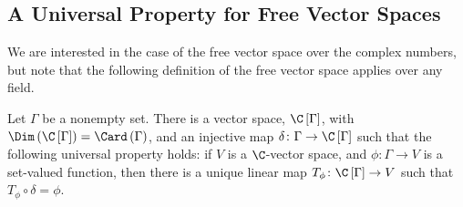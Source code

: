 \subsection{A Universal Property for Free Vector Spaces}%
We are interested in the case of the free vector space over the complex numbers, but note that the following definition of the free vector space applies over any field. 
\begin{theorem}
  Let $\Gamma$ be a nonempty set. There is a vector space, $\C\left[\Gamma\right]$, with $\Dim\left(\C\left[\Gamma\right]\right) = \Card\left(\Gamma\right)$, and an injective map $\delta\colon \Gamma\rightarrow \C\left[\Gamma\right]$ such that the following universal property holds: if $V$ is a $\C$-vector space, and $\phi\colon \Gamma\rightarrow V$ is a set-valued function, then there is a unique linear map $T_{\phi}\colon \C\left[\Gamma\right]\rightarrow V$ such that $T_{\phi}\circ \delta = \phi$.
  \begin{center}
  \end{center}
\end{theorem}

